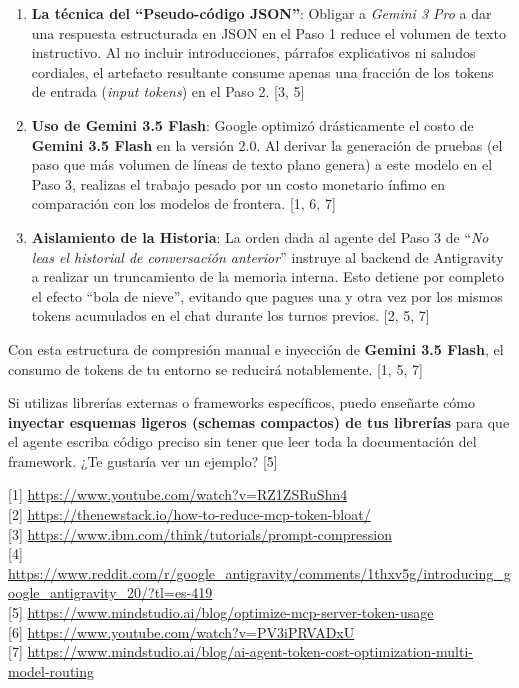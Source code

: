 \documentclass[12pt, a4paper]{article}
\begin{document}
\begin{enumerate}
    \item \textbf{La técnica del ``Pseudo-código JSON''}: Obligar a \textit{Gemini 3 Pro} a dar una respuesta estructurada en JSON en el Paso 1 reduce el volumen de texto instructivo. Al no incluir introducciones, párrafos explicativos ni saludos cordiales, el artefacto resultante consume apenas una fracción de los tokens de entrada (\textit{input tokens}) en el Paso 2. [3, 5]
    \item \textbf{Uso de Gemini 3.5 Flash}: Google optimizó drásticamente el costo de \textbf{Gemini 3.5 Flash} en la versión 2.0. Al derivar la generación de pruebas (el paso que más volumen de líneas de texto plano genera) a este modelo en el Paso 3, realizas el trabajo pesado por un costo monetario ínfimo en comparación con los modelos de frontera. [1, 6, 7]
    \item \textbf{Aislamiento de la Historia}: La orden dada al agente del Paso 3 de ``\textit{No leas el historial de conversación anterior}'' instruye al backend de Antigravity a realizar un truncamiento de la memoria interna. Esto detiene por completo el efecto ``bola de nieve'', evitando que pagues una y otra vez por los mismos tokens acumulados en el chat durante los turnos previos. [2, 5, 7]
\end{enumerate}

Con esta estructura de compresión manual e inyección de \textbf{Gemini 3.5 Flash}, el consumo de tokens de tu entorno se reducirá notablemente. [1, 5, 7]

Si utilizas librerías externas o frameworks específicos, puedo enseñarte cómo \textbf{inyectar esquemas ligeros (schemas compactos) de tus librerías} para que el agente escriba código preciso sin tener que leer toda la documentación del framework. ¿Te gustaría ver un ejemplo? [5]

[1] \url{https://www.youtube.com/watch?v=RZ1ZSRuShn4} \\{}
[2] \url{https://thenewstack.io/how-to-reduce-mcp-token-bloat/} \\{}
[3] \url{https://www.ibm.com/think/tutorials/prompt-compression} \\{}
[4] \url{https://www.reddit.com/r/google_antigravity/comments/1thxv5g/introducing_google_antigravity_20/?tl=es-419} \\{}
[5] \url{https://www.mindstudio.ai/blog/optimize-mcp-server-token-usage} \\{}
[6] \url{https://www.youtube.com/watch?v=PV3iPRVADxU} \\{}
[7] \url{https://www.mindstudio.ai/blog/ai-agent-token-cost-optimization-multi-model-routing}
\end{document}
